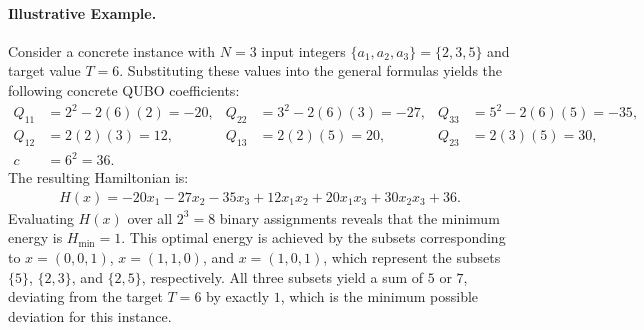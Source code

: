 \documentclass[12pt]{article}
\begin{document}
\paragraph{Illustrative Example.}
Consider a concrete instance with $N = 3$ input integers $\{a_1, a_2, a_3\} = \{2, 3, 5\}$ and target value $T = 6$. Substituting these values into the general formulas yields the following concrete QUBO coefficients:
\begin{align}
Q_{11} &= 2^2 - 2(6)(2) = -20, &
Q_{22} &= 3^2 - 2(6)(3) = -27, &
Q_{33} &= 5^2 - 2(6)(5) = -35, \\
Q_{12} &= 2(2)(3) = 12, &
Q_{13} &= 2(2)(5) = 20, &
Q_{23} &= 2(3)(5) = 30, \\
c &= 6^2 = 36. & & &
\end{align}
The resulting Hamiltonian is:
\begin{align}
H(x) = -20x_1 - 27x_2 - 35x_3 + 12x_1x_2 + 20x_1x_3 + 30x_2x_3 + 36.
\end{align}
Evaluating $H(x)$ over all $2^3 = 8$ binary assignments reveals that the minimum energy is $H_{\min} = 1$. This optimal energy is achieved by the subsets corresponding to $x = (0,0,1)$, $x = (1,1,0)$, and $x = (1,0,1)$, which represent the subsets $\{5\}$, $\{2,3\}$, and $\{2,5\}$, respectively. All three subsets yield a sum of $5$ or $7$, deviating from the target $T=6$ by exactly $1$, which is the minimum possible deviation for this instance.
\end{document}
